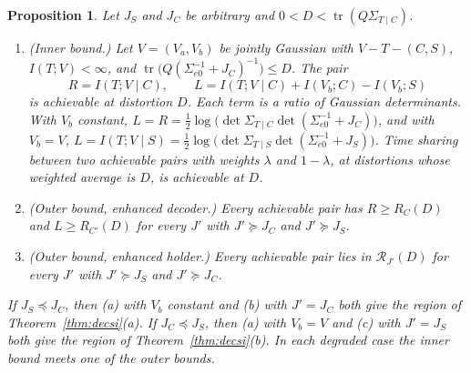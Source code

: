 \documentclass[11pt,onecolumn]{IEEEtran}
\newtheorem{proposition}[theorem]{Proposition}
\newcommand{\tr}{\operatorname{tr}}
\newcommand{\RW}{\mathcal{R}}
\newcommand{\Sez}{\Sigma_{e0}}
\begin{document}
\begin{proposition}\label{prop:decbounds}
Let $J_S$ and $J_C$ be arbitrary and $0<D<\tr(Q\Sigma_{T\mid C})$.
\begin{enumerate}
\item[(a)] (Inner bound.) Let $V=(V_a,V_b)$ be jointly Gaussian with
$V-T-(C,S)$, $I(T;V)<\infty$, and $\tr\bigl(Q(\Sez^{-1}+J_C)^{-1}\bigr)\le D$. The pair
\[
R=I(T;V\mid C),\qquad L=I(T;V\mid C)+I(V_b;C)-I(V_b;S)
\]
is achievable at distortion $D$. Each term is a ratio of Gaussian
determinants. With $V_b$ constant, $L=R=\tfrac12\log\bigl(\det\Sigma_{T\mid C}\det(\Sez^{-1}+J_C)\bigr)$,
and with $V_b=V$,
$L=I(T;V\mid S)=\tfrac12\log\bigl(\det\Sigma_{T\mid S}\det(\Sez^{-1}+J_S)\bigr)$.
Time sharing between two achievable pairs with weights $\lambda$ and
$1-\lambda$, at distortions whose weighted average is $D$, is achievable
at $D$.
\item[(b)] (Outer bound, enhanced decoder.) Every achievable pair has
$R\ge R_C(D)$ and $L\ge R_{C'}(D)$ for every $J'$ with $J'\succeq J_C$ and
$J'\succeq J_S$.
\item[(c)] (Outer bound, enhanced holder.) Every achievable pair lies in
$\RW_{J'}(D)$ for every $J'$ with $J'\succeq J_S$ and $J'\succeq J_C$.
\end{enumerate}
If $J_S\preceq J_C$, then (a) with $V_b$ constant and (b) with $J'=J_C$
both give the region of Theorem~\ref{thm:decsi}(a). If $J_C\preceq J_S$,
then (a) with $V_b=V$ and (c) with $J'=J_S$ both give the region of
Theorem~\ref{thm:decsi}(b). In each degraded case the inner bound meets
one of the outer bounds.
\end{proposition}
\end{document}
